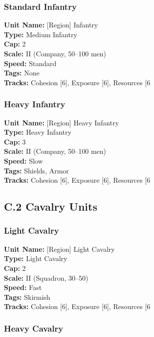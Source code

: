 \documentclass[11pt]{article}
\begin{document}
\subsubsection{Standard Infantry}

\textbf{Unit Name:} [Region] Infantry\\
\textbf{Type:} Medium Infantry\\
\textbf{Cap:} 2\\
\textbf{Scale:} II (Company, 50–100 men)\\
\textbf{Speed:} Standard\\
\textbf{Tags:} None\\
\textbf{Tracks:} Cohesion [6], Exposure [6], Resources [6

\subsubsection{Heavy Infantry}

\textbf{Unit Name:} [Region] Heavy Infantry\\
\textbf{Type:} Heavy Infantry\\
\textbf{Cap:} 3\\
\textbf{Scale:} II (Company, 50–100 men)\\
\textbf{Speed:} Slow\\
\textbf{Tags:} Shields, Armor\\
\textbf{Tracks:} Cohesion [6], Exposure [6], Resources [6

\subsection{C.2 Cavalry Units}

\subsubsection{Light Cavalry}

\textbf{Unit Name:} [Region] Light Cavalry\\
\textbf{Type:} Light Cavalry\\
\textbf{Cap:} 2\\
\textbf{Scale:} II (Squadron, 30–50)\\
\textbf{Speed:} Fast\\
\textbf{Tags:} Skirmish\\
\textbf{Tracks:} Cohesion [6], Exposure [6], Resources [6

\subsubsection{Heavy Cavalry}
\end{document}
